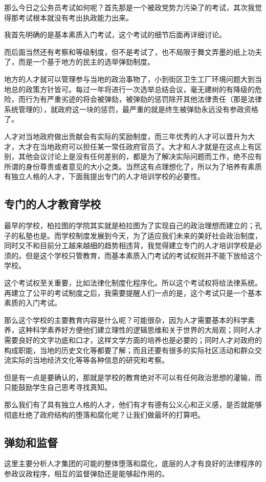 \documentclass[11pt,oneside]{article}
\begin{document}
\begin{common-format}
那么今日之公务员考试如何呢？首先那是一个被政党势力污染了的考试，其次我觉得那考试根本就没有考出执政能力出来。

我首先明确的是基本素质入门考试，这个考试的细节后面再详细讨论。

而后面当然还有考察和等级制度，但不是考试了，也不局限于舞文弄墨的纸上功夫了，而是一个基于地方的民主的选举弹劾制度。

地方的人才就可以管理参与当地的政治事物了，小到街区卫生工厂环境问题大到当地总的政策方针皆可。每过一年将进行一次选举总结会议，毫无建树的有降级的危险，而行为有严重劣迹的将会被弹劾，被弹劾的惩罚除开其他法律责任（那是法律系统管理的），就政府这一块的惩罚，最严重的就是终生被弹劾永远没有参政资格了。

人才对当地政府做出贡献会有实际的奖励制度，而三年优秀的人才可以晋升为大才，大才在当地政府可以担任某一常任政府官员了。大才和人才就是在这点上有区别，其他会议讨论上是没有任何差别的，都是为了解决实际问题而工作，绝不应有所谓的身份尊贵或者意见的大小之类。当然这有点理想化了，所以为了培养有素质有独立人格的人才，下面我提出专门的人才培训学校的必要性。

\subsection{专门的人才教育学校}
最早的学校，柏拉图的学院其实就是柏拉图为了实现自己的政治理想而建立的；孔子的私塾也是。而学校制度发展到今天，为了适应我们未来的美好社会政治制度，同时又不和目前分工越来越细的趋势相违背，我觉得建立专门的人才培训学校是必须的。但是这个学校只管教育，而基本素质入门考试的考试权则并不能下放给这个学校。

这个考试权至关重要，比如法律化制度化程序化。所以这个考试权将给法律系统。再建立了公平的考试制度之后，我需要提醒人们一点的是，这个考试只是一个基本素质的入门考试。

那么这个学校的主要教育内容是什么呢？可能很杂，因为人才需要基本的科学素养，这种科学素养好方便他们建立理性的逻辑思维和关于世界的大局观；同时人才需要良好的文字功底和口才，这样文学方面的培养也是必要的；同时人才对政府的构成职能，当地的历史文化等都要了解；而且还要有很多的实际社区活动和群众交流实际的当地经济文化等等各种信息的研究和考察。

但是有一点是要确认的，那就是学校的教育绝对不可以有任何政治思想的灌输，而只能鼓励学生自己思考寻找真知。


那么我们有了具有独立人格的人才，他们有才有德有公义心和正义感，是否就能够彻底杜绝了政府结构的堕落和腐化呢？让我们做最坏的打算吧。

\subsection{弹劾和监督}
这里主要分析人才集团的可能的整体堕落和腐化，底层的人才有良好的法律程序的参政议政程序，相互的监督弹劾还是能够起作用的。


\end{common-format}
\end{document}
